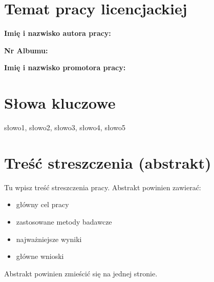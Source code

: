 \section*{Temat pracy licencjackiej}
\noindent
\textbf{Imię i nazwisko autora pracy:} \dotfill

\noindent
\textbf{Nr Albumu:} \dotfill

\noindent
\textbf{Imię i nazwisko promotora pracy:} \dotfill

\section*{Słowa kluczowe}
słowo1, słowo2, słowo3, słowo4, słowo5

\section*{Treść streszczenia (abstrakt)}
Tu wpisz treść streszczenia pracy. Abstrakt powinien zawierać:
\begin{itemize}
    \item główny cel pracy
    \item zastosowane metody badawcze
    \item najważniejsze wyniki
    \item główne wnioski
\end{itemize}

Abstrakt powinien zmieścić się na jednej stronie.